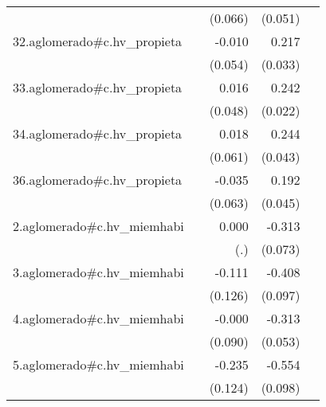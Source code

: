 {\begin{longtable}{l*{4}{D{.}{.}{-1}}}
            &                     &     (0.066)         &     (0.051)         &                     \\
\addlinespace
32.aglomerado#c.hv\_propieta&                     &      -0.010         &       0.217\sym{***}&                     \\
            &                     &     (0.054)         &     (0.033)         &                     \\
\addlinespace
33.aglomerado#c.hv\_propieta&                     &       0.016         &       0.242\sym{***}&                     \\
            &                     &     (0.048)         &     (0.022)         &                     \\
\addlinespace
34.aglomerado#c.hv\_propieta&                     &       0.018         &       0.244\sym{***}&                     \\
            &                     &     (0.061)         &     (0.043)         &                     \\
\addlinespace
36.aglomerado#c.hv\_propieta&                     &      -0.035         &       0.192\sym{***}&                     \\
            &                     &     (0.063)         &     (0.045)         &                     \\
\addlinespace
2.aglomerado#c.hv\_miemhabi&                     &       0.000         &      -0.313\sym{***}&                     \\
            &                     &         (.)         &     (0.073)         &                     \\
\addlinespace
3.aglomerado#c.hv\_miemhabi&                     &      -0.111         &      -0.408\sym{***}&                     \\
            &                     &     (0.126)         &     (0.097)         &                     \\
\addlinespace
4.aglomerado#c.hv\_miemhabi&                     &      -0.000         &      -0.313\sym{***}&                     \\
            &                     &     (0.090)         &     (0.053)         &                     \\
\addlinespace
5.aglomerado#c.hv\_miemhabi&                     &      -0.235         &      -0.554\sym{***}&                     \\
            &                     &     (0.124)         &     (0.098)         &                     \\

\end{longtable}}
